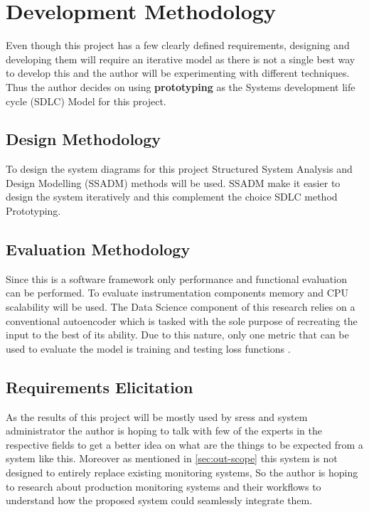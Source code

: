 \section{Development Methodology}

Even though this project has a few clearly defined requirements, designing and developing them will require an iterative model as there is not a single best way to develop this and the author will be experimenting with different techniques. Thus the author decides on using \textbf{prototyping} as the Systems development life cycle (SDLC) Model for this project.\\

\subsection{Design Methodology}

To design the system diagrams for this project Structured System Analysis and Design Modelling (SSADM) methods will be used. SSADM make it easier to design the system iteratively and this complement the choice SDLC method Prototyping.

\subsection{Evaluation Methodology}

Since this is a software framework only performance and functional evaluation can be performed. To evaluate instrumentation components memory and CPU scalability will be used. The Data Science component of this research relies on a conventional autoencoder which is tasked with the sole purpose of recreating the input to the best of its ability. Due to this nature, only one metric that can be used to evaluate the model is training and testing loss functions \citep{gondara2016medical}. 

\subsection{Requirements Elicitation}

As the results of this project will be mostly used by \acp{sres} and system administrator the author is hoping to talk with few of the experts in the respective fields to get a better idea on what are the things to be expected from a system like this. Moreover as mentioned in \ref{sec:out-scope} this system is not designed to entirely replace existing monitoring systems, So the author is hoping to research about production monitoring systems and their workflows to understand how the proposed system could seamlessly integrate them. 
